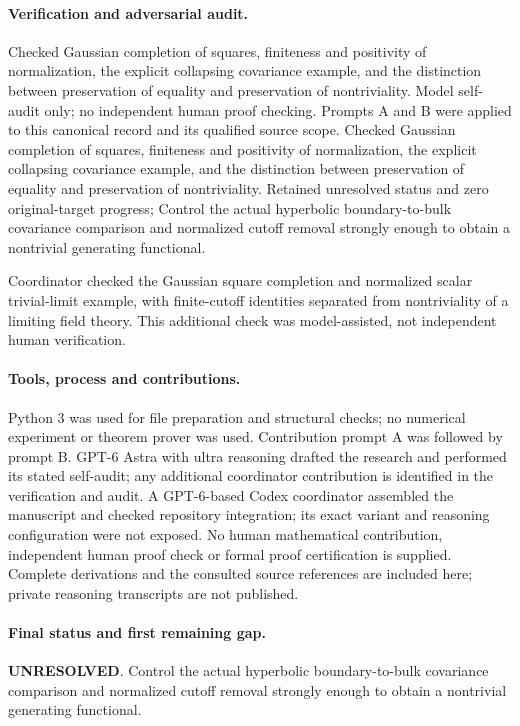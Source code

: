 \documentclass[11pt]{article}
\begin{document}
\paragraph{Verification and adversarial audit.}
Checked Gaussian completion of squares, finiteness and positivity of normalization, the explicit collapsing covariance example, and the distinction between preservation of equality and preservation of nontriviality. Model self-audit only; no independent human proof checking. Prompts A and B were applied to this canonical record and its qualified source scope. Checked Gaussian completion of squares, finiteness and positivity of normalization, the explicit collapsing covariance example, and the distinction between preservation of equality and preservation of nontriviality. Retained unresolved status and zero original-target progress; Control the actual hyperbolic boundary-to-bulk covariance comparison and normalized cutoff removal strongly enough to obtain a nontrivial generating functional.

Coordinator checked the Gaussian square completion and normalized scalar trivial-limit example, with finite-cutoff identities separated from nontriviality of a limiting field theory. This additional check was model-assisted, not independent human verification.

\paragraph{Tools, process and contributions.}
Python 3 was used for file preparation and structural checks; no numerical experiment or theorem prover was used. Contribution prompt A was followed by prompt B. GPT-6 Astra with ultra reasoning drafted the research and performed its stated self-audit; any additional coordinator contribution is identified in the verification and audit. A GPT-6-based Codex coordinator assembled the manuscript and checked repository integration; its exact variant and reasoning configuration were not exposed. No human mathematical contribution, independent human proof check or formal proof certification is supplied. Complete derivations and the consulted source references are included here; private reasoning transcripts are not published.

\paragraph{Final status and first remaining gap.}
\textbf{UNRESOLVED}. Control the actual hyperbolic boundary-to-bulk covariance comparison and normalized cutoff removal strongly enough to obtain a nontrivial generating functional.
\end{document}
